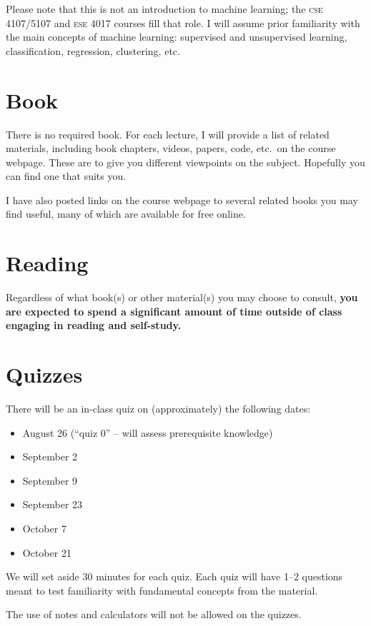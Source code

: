 \documentclass{article}
\newcommand{\acro}[1]{\textsc{\MakeLowercase{#1}}}
\begin{document}
Please note that this is not an introduction to machine learning; the \acro{CSE
  4107/5107} and \acro{ESE 4017} courses fill that role.  I will assume prior
familiarity with the main concepts of machine learning: supervised and
unsupervised learning, classification, regression, clustering, etc.

\section*{Book}

There is no required book. For each lecture, I will provide a list of related
materials, including book chapters, videos, papers, code, etc.\ on the course
webpage.  These are to give you different viewpoints on the subject.  Hopefully
you can find one that suits you.

I have also posted links on the course webpage to several related books you may
find useful, many of which are available for free online.

\section*{Reading}

Regardless of what book(s) or other material(s) you may choose to consult,
\textbf{you are expected to spend a significant amount of time outside of class
  engaging in reading and self-study.}

\section*{Quizzes}

There will be an in-class quiz on (approximately) the following dates:
\begin{itemize}
  \item August 26 (``quiz 0'' -- will assess prerequisite knowledge)
  \item September 2
  \item September 9
  \item September 23
  \item October 7
  \item October 21
\end{itemize}
We will set aside 30 minutes for each quiz. Each quiz will have 1--2
questions meant to test familiarity with fundamental concepts from the material.

The use of notes and calculators will not be allowed on the quizzes.
\end{document}
